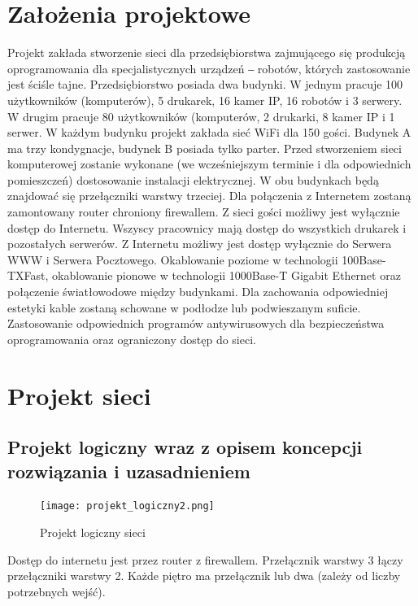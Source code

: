 \documentclass{article}
\begin{document}
\section{Założenia projektowe}
Projekt zakłada stworzenie sieci dla przedsiębiorstwa zajmującego się produkcją oprogramowania dla specjalistycznych urządzeń ‒ robotów, których zastosowanie jest ściśle tajne. Przedsiębiorstwo posiada dwa budynki. W jednym pracuje 100 użytkowników (komputerów), 5 drukarek, 16 kamer IP, 16 robotów i 3 serwery. W drugim pracuje 80 użytkowników (komputerów, 2 drukarki, 8 kamer IP i 1 serwer. W każdym budynku projekt zakłada sieć WiFi dla 150 gości. Budynek A ma trzy kondygnacje, budynek B posiada tylko parter. Przed stworzeniem sieci komputerowej zostanie wykonane (we wcześniejszym terminie i dla odpowiednich pomieszczeń) dostosowanie instalacji elektrycznej.
W obu budynkach będą znajdować się przełączniki warstwy trzeciej.
Dla połączenia z Internetem zostaną zamontowany router chroniony firewallem.
Z sieci gości możliwy jest wyłącznie dostęp do Internetu.
Wszyscy pracownicy mają dostęp do wszystkich drukarek i pozostałych serwerów. Z Internetu możliwy jest dostęp wyłącznie do Serwera WWW i Serwera Pocztowego.
Okablowanie poziome w technologii 100Base-TXFast, okablowanie pionowe w technologii 1000Base-T Gigabit Ethernet oraz połączenie światłowodowe między budynkami. Dla zachowania odpowiedniej estetyki kable zostaną schowane w podłodze lub podwieszanym suficie.
Zastosowanie odpowiednich programów antywirusowych dla bezpieczeństwa oprogramowania oraz ograniczony dostęp do sieci.

\newpage
\section{Projekt sieci}
\subsection{Projekt logiczny wraz z opisem koncepcji rozwiązania i uzasadnieniem}
\begin{figure}[!ht]	
	\centering
	\texttt{[image: projekt\_logiczny2.png]}
	\caption{Projekt logiczny sieci}
	\label{fig:obrazek 1}
\end{figure}
Dostęp do internetu jest przez router z firewallem. Przełącznik warstwy 3 łączy przełączniki warstwy 2. Każde piętro ma przełącznik lub dwa (zależy od liczby potrzebnych wejść).
\end{document}
